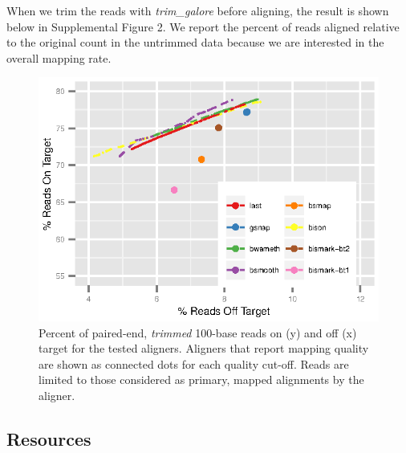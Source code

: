 \documentclass[12pt]{article}
\begin{document}
When we trim the reads with \emph{trim\_galore} before aligning, the result is shown below in Supplemental Figure 2. We report the percent of reads aligned relative
to the original count in the untrimmed data because we are interested in the
overall mapping rate.

\begin{figure}[H]%
    \centerline{\includegraphics[width=125mm]{real-trim-quals.eps}}
    \caption{Percent of paired-end, \emph{trimmed} 100-base reads on (y) and off (x) target for the tested aligners. Aligners that report mapping quality are shown as connected dots for each quality cut-off. Reads are limited to those considered as primary, mapped alignments by the aligner.}\label{suppfig:02}
\end{figure}

\subsection{Resources}
\end{document}
